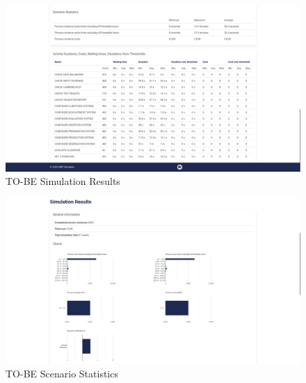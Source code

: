 \begin{figure}[H]
    \centering
    \includegraphics[width=1\textwidth]{figures/TO-BE Simulation Results.png}
    \caption{TO-BE Simulation Results}
    \label{fig:to_be_simulation_results}
\end{figure}

\begin{figure}[H]
    \centering
    \includegraphics[width=1\textwidth]{figures/TO-BE Scenario Statistics.png}
    \caption{TO-BE Scenario Statistics}
    \label{fig:to_be_scenario_Statistics}
\end{figure}

\newpage








